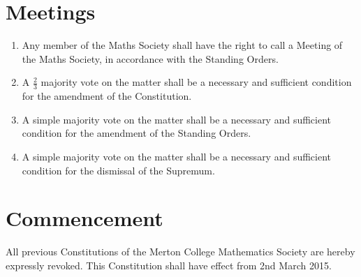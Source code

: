 \documentclass[pdftex,a4paper]{report}
\begin{document}
\section*{Meetings}

\begin{enumerate}[label=\Roman*)]
	\item Any member of the Maths Society shall have the right to call a Meeting of the Maths Society, in accordance with the Standing Orders.
	\item A $\frac{2}{3}$ majority vote on the matter shall be a necessary and sufficient condition for the amendment of the Constitution.
	\item A simple majority vote on the matter shall be a necessary and sufficient condition for the amendment of the Standing Orders.
	\item A simple majority vote on the matter shall be a necessary and sufficient condition for the dismissal of the Supremum.
\end{enumerate}


\section*{Commencement}

All previous Constitutions of the Merton College Mathematics Society are hereby expressly revoked. This Constitution shall have effect from 2nd March 2015.
\end{document}
